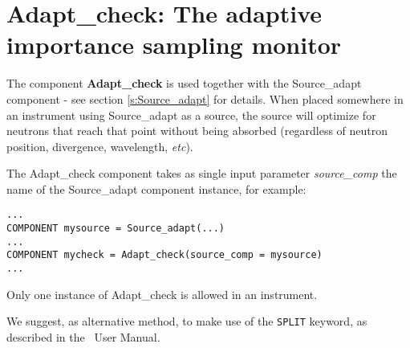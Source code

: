 \section{Adapt\_check: The adaptive importance sampling monitor}
\label{s:adapt_check}


The component {\bf Adapt\_check} is used together with the Source\_adapt component - see section \ref{s:Source_adapt} for details. When placed somewhere in an instrument using Source\_adapt as a source, the source will optimize for neutrons that reach that point without being absorbed (regardless of neutron position, divergence, wavelength, \emph{etc}).

The Adapt\_check component takes as single input parameter \emph{source\_comp} the name of the Source\_adapt component instance, for example:

\begin{verbatim}
...
COMPONENT mysource = Source_adapt(...)
...
COMPONENT mycheck = Adapt_check(source_comp = mysource)
...
\end{verbatim}

Only one instance of Adapt\_check is allowed in an instrument.

We suggest, as alternative method, to make use of the \texttt{SPLIT} keyword, as described in the \MCS\ User Manual.

